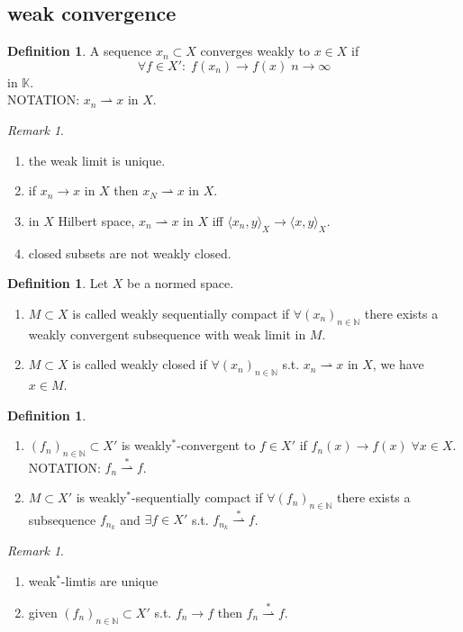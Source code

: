 \documentclass[a4paper, 12pt]{article}
\theoremstyle{plain}
\theoremstyle{definition}
\newtheorem{definition}[theorem]{Definition} %
\theoremstyle{lemma}
\theoremstyle{remark}
\newtheorem{remark}[theorem]{Remark}
\theoremstyle{corollary}
\theoremstyle{example}
\begin{document}
	\subsection{weak convergence}
	\begin{definition}
		A sequence $x_n \subset X$ converges weakly to $x \in X$ if \[\forall f \in X': \; f(x_n) \to f(x) \; n \to \infty\] in $\mathbb{K}$.\\
		NOTATION: $x_n\rightharpoonup x$ in $X$.
	\end{definition}
	\begin{remark}
		\begin{enumerate}
			\item the weak limit is unique.
			\item if $x_n \to x$ in $X$ then $x_N \rightharpoonup x$ in $X$.
			\item in $X$ Hilbert space, $x_n \rightharpoonup x$ in $X$ iff $\langle x_n,y\rangle_X \to \langle x,y \rangle_X$.
			\item closed subsets are not weakly closed.
		\end{enumerate}
	\end{remark}
	\begin{definition}
		Let $X$ be a normed space. \begin{enumerate}
			\item $M\subset X$ is called weakly sequentially compact if $\forall (x_n)_{n \in \mathbb{N}}$ there exists a weakly convergent subsequence with weak limit in $M$.
			\item $M\subset X$ is called weakly closed if $\forall (x_n)_{n \in \mathbb{N}}$ s.t. $x_n \rightharpoonup x$ in $X$, we have $x\in M$.
		\end{enumerate}
	\end{definition}
	\begin{definition}
		\begin{enumerate}
			\item $(f_n)_{n\in \mathbb{N}} \subset X'$ is weakly$^*$-convergent to $f \in X'$ if $f_n(x) \to f(x) \; \forall x \in X$. NOTATION: $f_n\overset{*}{\rightharpoonup} f$.
			\item $M\subset X'$ is weakly$^*$-sequentially compact if $\forall (f_n)_{n\in \mathbb{N}}$ there exists a subsequence $f_{n_k}$ and $\exists f \in X'$ s.t. $f_{n_k} \overset{*}{\rightharpoonup} f$.
		\end{enumerate}
	\end{definition}
	\begin{remark}
		\begin{enumerate}
			\item weak$^*$-limtis are unique
			\item given $(f_n)_{n \in \mathbb{N}} \subset X'$ s.t. $f_n\to f$ then $f_n \overset{*}{\rightharpoonup} f$.
		\end{enumerate}
	\end{remark}
\end{document}
